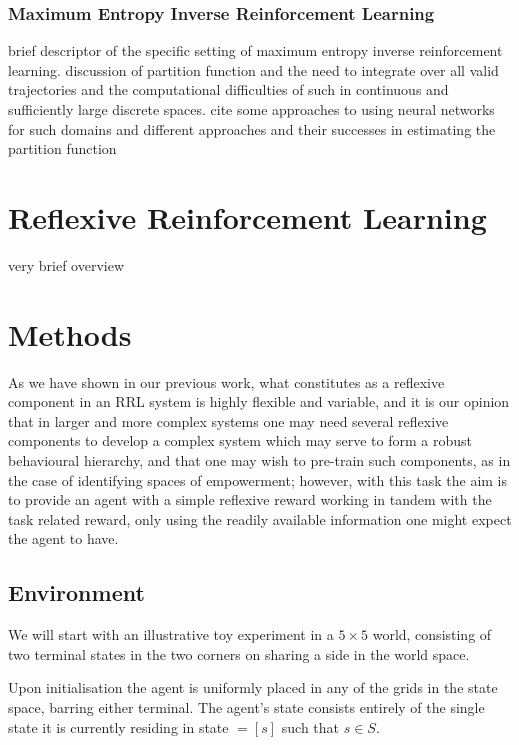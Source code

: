 \documentclass{article}
\begin{document}
\subsubsection{Maximum Entropy Inverse Reinforcement Learning}

brief descriptor of the specific setting of maximum entropy inverse reinforcement learning. discussion of partition function and the need to integrate over all valid trajectories and the computational difficulties of such in continuous and sufficiently large discrete spaces. cite some approaches to using neural networks for such domains and different approaches and their successes in estimating the partition function

\cite{finn2016connection}

\section{Reflexive Reinforcement Learning}

very brief overview~\cite{lyons2020relexive}

\section{Methods}

As we have shown in our previous work, what constitutes as a reflexive component in an RRL system is highly flexible and variable, and it is our opinion that in larger and more complex systems one may need several reflexive components to develop a complex system which may serve to form a robust behavioural hierarchy, and that one may wish to pre-train such components, as in the case of identifying spaces of empowerment; however, with this task the aim is to provide an agent with a simple reflexive reward working in tandem with the task related reward, only using the readily available information one might expect the agent to have.

\subsection{Environment}
We will start with an illustrative toy experiment in a $5\times 5$ world, consisting of two terminal states in the two corners on sharing a side in the world space. %

Upon initialisation the agent is uniformly placed in any of the grids in the state space, barring either terminal. The agent's state consists entirely of the single state it is currently residing in state $= [s]$ such that $s \in S$.
\end{document}
